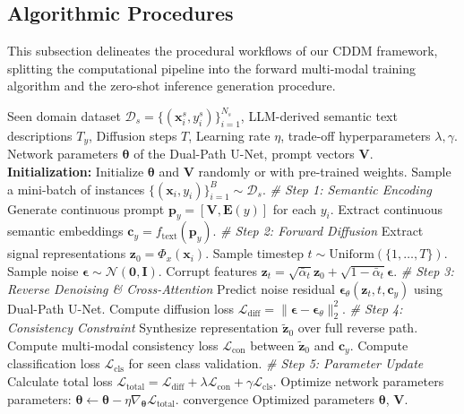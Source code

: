 \subsection{Algorithmic Procedures}
\label{subsec:algorithm}

This subsection delineates the procedural workflows of our CDDM framework, splitting the computational pipeline into the forward multi-modal training algorithm and the zero-shot inference generation procedure.

\begin{algorithm}[H]
\caption{CDDM Training Procedure}
\label{alg:training}
\begin{algorithmic}[1]
\REQUIRE Seen domain dataset $\mathcal{D}_s = \{(\mathbf{x}_i^s, y_i^s)\}_{i=1}^{N_s}$, LLM-derived semantic text descriptions $T_y$, Diffusion steps $T$, Learning rate $\eta$, trade-off hyperparameters $\lambda, \gamma$.
\ENSURE Network parameters $\boldsymbol{\theta}$ of the Dual-Path U-Net, prompt vectors $\mathbf{V}$.
\STATE \textbf{Initialization:} Initialize $\boldsymbol{\theta}$ and $\mathbf{V}$ randomly or with pre-trained weights.
\REPEAT
    \STATE Sample a mini-batch of instances $\{(\mathbf{x}_i, y_i)\}_{i=1}^B \sim \mathcal{D}_s$.
    \STATE \textit{\# Step 1: Semantic Encoding}
    \STATE Generate continuous prompt $\mathbf{p}_y = [\mathbf{V}, \mathbf{E}(y)]$ for each $y_i$.
    \STATE Extract continuous semantic embeddings $\mathbf{c}_y = f_{\text{text}}(\mathbf{p}_y)$.
    \STATE \textit{\# Step 2: Forward Diffusion}
    \STATE Extract signal representations $\mathbf{z}_0 = \Phi_x(\mathbf{x}_i)$.
    \STATE Sample timestep $t \sim \text{Uniform}(\{1, \dots, T\})$.
    \STATE Sample noise $\boldsymbol{\epsilon} \sim \mathcal{N}(\mathbf{0}, \mathbf{I})$.
    \STATE Corrupt features $\mathbf{z}_t = \sqrt{\bar{\alpha}_t}\mathbf{z}_0 + \sqrt{1 - \bar{\alpha}_t}\boldsymbol{\epsilon}$.
    \STATE \textit{\# Step 3: Reverse Denoising \& Cross-Attention}
    \STATE Predict noise residual $\boldsymbol{\epsilon}_\theta(\mathbf{z}_t, t, \mathbf{c}_y)$ using Dual-Path U-Net.
    \STATE Compute diffusion loss $\mathcal{L}_{\text{diff}} = \| \boldsymbol{\epsilon} - \boldsymbol{\epsilon}_\theta \|_2^2$.
    \STATE \textit{\# Step 4: Consistency Constraint}
    \STATE Synthesize representation $\tilde{\mathbf{z}}_0$ over full reverse path.
    \STATE Compute multi-modal consistency loss $\mathcal{L}_{\text{con}}$ between $\tilde{\mathbf{z}}_0$ and $\mathbf{c}_y$.
    \STATE Compute classification loss $\mathcal{L}_{\text{cls}}$ for seen class validation.
    \STATE \textit{\# Step 5: Parameter Update}
    \STATE Calculate total loss $\mathcal{L}_{\text{total}} = \mathcal{L}_{\text{diff}} + \lambda \mathcal{L}_{\text{con}} + \gamma \mathcal{L}_{\text{cls}}$.
    \STATE Optimize network parameters parameters: $\boldsymbol{\theta} \leftarrow \boldsymbol{\theta} - \eta \nabla_{\boldsymbol{\theta}} \mathcal{L}_{\text{total}}$.
\UNTIL convergence
\RETURN Optimized parameters $\boldsymbol{\theta}$, $\mathbf{V}$.
\end{algorithmic}
\end{algorithm}

